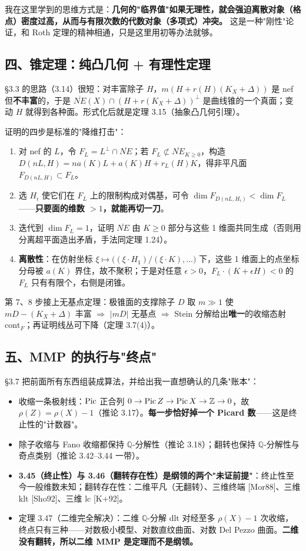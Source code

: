 我在这里学到的思维方式是：\textbf{几何的"临界值"如果无理性，就会强迫离散对象（格点）密度过高，从而与有限次数的代数对象（多项式）冲突。} 这是一种"刚性"论证，和 Roth 定理的精神相通，只是这里用初等办法就够。

\subsection*{四、锥定理：纯凸几何 + 有理性定理}

\S3.3 的思路（3.14）很短：对丰富除子 $H$，$m(H+r(H)(K_X+\Delta))$ 是 nef 但\textbf{不丰富}的，于是 $\overline{NE}(X)\cap(H+r(K_X+\Delta))^\perp$ 是曲线锥的一个真面；变动 $H$ 就得到各种面。形式化后就是定理 3.15（抽象凸几何引理）。

证明的四步是标准的"降维打击"：
\begin{enumerate}
\item 对 nef 的 $L$，令 $F_L=L^\perp\cap\overline{NE}$；若 $F_L\not\subset\overline{NE}_{K\ge0}$，构造 $D(nL,H)=na(K)L+a(K)H+r_L(H)K$，得非平凡面 $F_{D(nL,H)}\subset F_L$。
\item 选 $H_i$ 使它们在 $F_L$ 上的限制构成对偶基，可令 $\dim F_{D(nL,H_i)}<\dim F_L$ ——\textbf{只要面的维数 $>1$，就能再切一刀}。
\item 迭代到 $\dim F_L=1$，证明 $\overline{NE}$ 由 $K\ge0$ 部分与这些 1 维面共同生成（否则用分离超平面造出矛盾，手法同定理 1.24）。
\item \textbf{离散性}：在仿射坐标 $\xi\mapsto\big((\xi\cdot H_1)/(\xi\cdot K),\dots\big)$ 下，这些 1 维面上的点坐标分母被 $a(K)$ 界住，故不聚积；于是对任意 $\epsilon>0$，$F_L\cdot(K+\epsilon H)<0$ 的 $F_L$ 只有有限个，右侧是闭锥。
\end{enumerate}

第 7、8 步接上无基点定理：极锥面的支撑除子 $D$ 取 $m\gg1$ 使 $mD-(K_X+\Delta)$ 丰富 $\Rightarrow$ $|mD|$ 无基点 $\Rightarrow$ Stein 分解给出\textbf{唯一}的收缩态射 $\mathrm{cont}_F$；再证明线丛可下降（定理 3.7(4)）。

\subsection*{五、MMP 的执行与"终点"}

\S3.7 把前面所有东西组装成算法，并给出我一直想确认的几条"账本"：

\begin{itemize}
\item 收缩一条极射线：$\operatorname{Pic}$ 正合列 $0\to\operatorname{Pic} Z\to\operatorname{Pic} X\to\mathbb{Z}\to0$，故 $\rho(Z)=\rho(X)-1$（推论 3.17）。\textbf{每一步恰好掉一个 Picard 数}——这是终止性的"计数器"。
\item 除子收缩与 Fano 收缩都保持 $\mathbb{Q}$-分解性（推论 3.18）；翻转也保持 $\mathbb{Q}$-分解性与奇点类别（推论 3.42--3.44 一带）。
\item \textbf{3.45（终止性）与 3.46（翻转存在性）是纲领的两个"未证前提"}：终止性至今一般维数未知；翻转存在性：二维平凡（无翻转）、三维终端 [Mor88]、三维 klt [Sho92]、三维 lc [K+92]。
\item 定理 3.47（二维完全解决）：二维 $\mathbb{Q}$-分解 dlt 对经至多 $\rho(X)-1$ 次收缩，终点只有三种——对数极小模型、对数直纹曲面、对数 Del Pezzo 曲面。\textbf{二维没有翻转，所以二维 MMP 是定理而不是纲领。}
\end{itemize}

